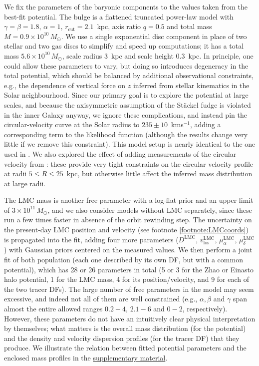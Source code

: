 \documentclass[usenatbib,fleqn]{mnras}
\newcommand{\kms}{km\:s$^{-1}$\xspace}
\begin{document}
We fix the parameters of the baryonic components to the values taken from the \citet{McMillan2017} best-fit potential. The bulge is a flattened truncated power-law model with $\gamma=\beta=1.8$, $\alpha=1$, $r_\text{cut}=2.1$~kpc, axis ratio $q=0.5$ and total mass $M=0.9\times10^{10}\,M_\odot$. We use a single exponential disc component in place of two stellar and two gas discs to simplify and speed up computations; it has a total mass $5.6\times10^{10}\,M_\odot$, scale radius 3~kpc and scale height 0.3~kpc. In principle, one could allow these parameters to vary, but doing so introduces degeneracy in the total potential, which should be balanced by additional observational constraints, e.g., the dependence of vertical force on $z$ inferred from stellar kinematics in the Solar neighbourhood. Since our primary goal is to explore the potential at large scales, and because the axisymmetric assumption of the St\"ackel fudge is violated in the inner Galaxy anyway, we ignore these complications, and instead pin the circular-velocity curve at the Solar radius to $235\pm10$~\kms \citep{McMillan2017}, adding a corresponding term to the likelihood function (although the results change very little if we remove this constraint). This model setup is nearly identical to the one used in \citet{Vasiliev2019b}. We also explored the effect of adding measurements of the circular velocity from \citet{Eilers2019}: these provide very tight constraints on the circular velocity profile at radii $5\le R \le 25$~kpc, but otherwise little affect the inferred mass distribution at large radii.

The LMC mass is another free parameter with a log-flat prior and an upper limit of $3\times10^{11}\,M_\odot$, and we also consider models without LMC separately, since these run a few times faster in absence of the orbit rewinding step. The uncertainty on the present-day LMC position and velocity (see footnote \ref{footnote:LMCcoords}) is propagated into the fit, adding four more parameters ($D^\text{LMC}$, $v_\text{los}^\text{LMC}$, $\mu_\alpha^\text{LMC}$, $\mu_\delta^\text{LMC}$) with Gaussian priors centered on the measured values.
We then perform a joint fit of both population (each one described by its own DF, but with a common potential), which has 28 or 26 parameters in total (5 or 3 for the Zhao or Einasto halo potential, 1 for the LMC mass, 4 for its position/velocity, and 9 for each of the two tracer DFs).
The large number of free parameters in the model may seem excessive, and indeed not all of them are well constrained (e.g., $\alpha, \beta$ and $\gamma$ span almost the entire allowed ranges $0.2-4$, $2.1-6$ and $0-2$, respectively). However, these parameters do not have an intuitively clear physical interpretation by themselves; what matters is the overall mass distribution (for the potential) and the density and velocity dispersion profiles (for the tracer DF) that they produce. We illustrate the relation between fitted potential parameters and the enclosed mass profiles in the \hyperref[sec:covplots]{supplementary material}.
\end{document}
